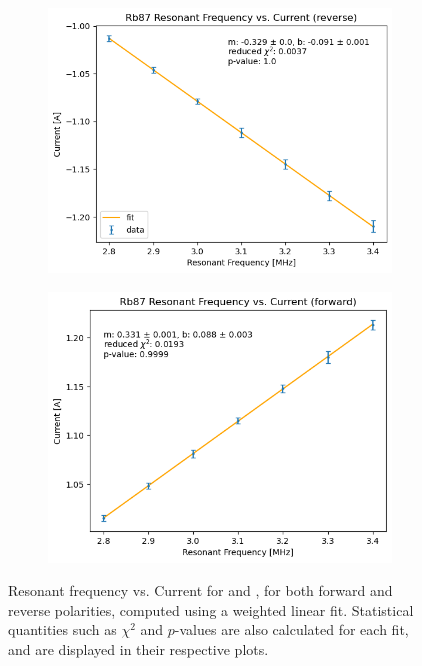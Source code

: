 \documentclass[10pt]{article}
\begin{document}
\begin{figure}
\begin{subfigure}{0.4\textwidth}
			\includegraphics[scale=0.4]{images/rb87-neg-weighted.png}
			\caption{}
		\end{subfigure}
		\begin{subfigure}{0.4\textwidth}
			\includegraphics[scale=0.4]{images/rb87-pos-weighted.png}
			\caption{}
		\end{subfigure}
		\caption{Resonant frequency vs. Current for  and ,
			for both forward and reverse polarities, computed using a weighted
			linear fit. Statistical quantities such as \(
			\chi^2 \) and \( p \)-values are also calculated for each fit, and are
		displayed in their respective plots.}  
		\label{res-current-weighted}
	\end{figure}
\end{document}
